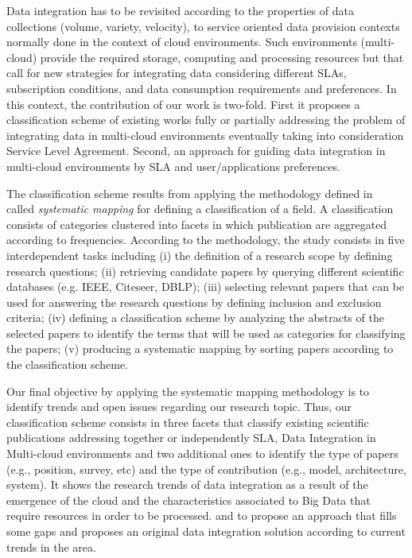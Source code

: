Data integration has to be revisited according to  the properties of data collections (volume, variety, velocity), to service oriented data provision contexts normally done in the context of cloud environments. Such environments (multi-cloud)  provide the required storage, computing and processing resources but that call for new strategies for integrating data considering different SLAs, subscription conditions, and data consumption requirements and preferences. In this context, the contribution of our work is two-fold. First it proposes a classification scheme of existing works fully or partially addressing the problem of integrating data in multi-cloud environments eventually taking into consideration Service Level Agreement. Second, an approach for guiding data integration in multi-cloud environments  by SLA and user/applications preferences. 

The classification scheme results from  applying the  methodology defined in~\cite{SM:Petersen:2008} called  \textit{systematic mapping}  for defining a classification of a field. A classification consists of categories clustered into facets in which publication are aggregated according to frequencies. According to the methodology, the study consists in  five interdependent tasks including (i) the definition of a research scope by defining research questions; (ii) retrieving candidate papers by querying different scientific databases (e.g. IEEE, Citeseer, DBLP); (iii) selecting relevant papers that can be used for answering the research questions by defining inclusion and exclusion criteria; (iv) defining a classification scheme by analyzing the abstracts of the selected papers to identify the terms that will be used as categories for classifying the papers; (v) producing a systematic mapping by sorting papers according to the classification scheme. 

Our final objective by applying the systematic mapping methodology is to identify trends and open issues regarding our research topic. Thus, our classification scheme consists in three facets that classify existing scientific publications addressing  together or independently SLA, Data Integration in Multi-cloud environments and two additional ones to identify the type of papers (e.g., position, survey, etc) and the type of contribution (e.g., model, architecture, system). It shows the research trends of data integration as a result of the emergence of the cloud and the characteristics associated to Big Data that require resources in order to be processed.  and to propose an approach that fills some gaps and proposes an original data integration solution according to current trends in the area. 



